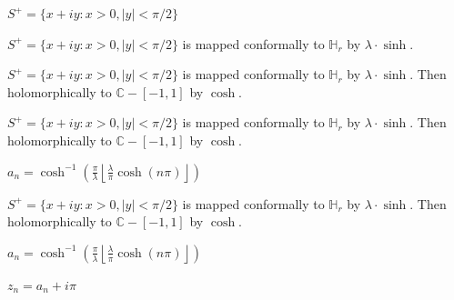 \documentclass{beamer}
\begin{document}
\begin{frame} 

$S^+ = \{ x + iy : x > 0, |y| < \pi/2 \}$ 

\end{frame}





\begin{frame} 

$S^+ = \{ x + iy : x > 0, |y| < \pi/2 \}$ is mapped conformally to $\mathbb{H}_r$ by $\lambda\cdot\sinh$.  

\end{frame}



\begin{frame} 

$S^+ = \{ x + iy : x > 0, |y| < \pi/2 \}$ is mapped conformally to $\mathbb{H}_r$ by $\lambda\cdot\sinh$. Then holomorphically to $\mathbb{C} - [-1,1]$ by $\cosh$.

\end{frame}




\begin{frame} 

$S^+ = \{ x + iy : x > 0, |y| < \pi/2 \}$ is mapped conformally to $\mathbb{H}_r$ by $\lambda\cdot\sinh$. Then holomorphically to $\mathbb{C} - [-1,1]$ by $\cosh$.

\vspace{2.5mm}

$a_n = \cosh^{-1}\left( \frac{\pi}{\lambda} \left \lfloor{ \frac{\lambda}{\pi} \cosh(n\pi) }\right \rfloor \right)$

\end{frame}





\begin{frame} 

$S^+ = \{ x + iy : x > 0, |y| < \pi/2 \}$ is mapped conformally to $\mathbb{H}_r$ by $\lambda\cdot\sinh$. Then holomorphically to $\mathbb{C} - [-1,1]$ by $\cosh$.

\vspace{2.5mm}

$a_n = \cosh^{-1}\left( \frac{\pi}{\lambda} \left \lfloor{ \frac{\lambda}{\pi} \cosh(n\pi) }\right \rfloor \right)$

\vspace{2.5mm}

$z_n = a_n + i\pi$

\end{frame}
\end{document}
